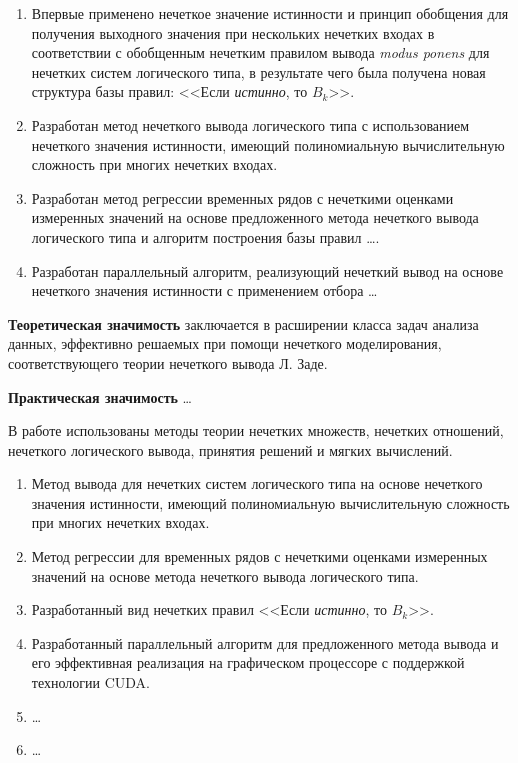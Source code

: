 {\novelty}
\begin{enumerate}[beginpenalty=10000] %
  \item Впервые применено нечеткое значение истинности и принцип обобщения для получения выходного значения при нескольких нечетких входах в соответствии с обобщенным нечетким правилом вывода \textit{modus ponens} для нечетких систем логического типа, в результате чего была получена новая структура базы правил: <<Если \textit{истинно}, то $B_k$>>.
  \item Разработан метод нечеткого вывода логического типа с использованием нечеткого значения истинности, имеющий полиномиальную вычислительную сложность при многих нечетких входах.
  \item Разработан метод регрессии временных рядов с нечеткими оценками измеренных значений на основе предложенного метода нечеткого вывода логического типа и алгоритм построения базы правил \dots.
  \item Разработан параллельный алгоритм, реализующий нечеткий вывод на основе нечеткого значения истинности с применением отбора \dots
\end{enumerate}

\textbf{Теоретическая значимость} заключается в расширении класса задач анализа данных, эффективно решаемых при помощи нечеткого моделирования, соответствующего теории нечеткого вывода Л. Заде.

\textbf{Практическая значимость} \ldots

{\methods} В работе использованы методы теории нечетких множеств, нечетких отношений, нечеткого логического вывода, принятия решений и мягких вычислений.

{}
\begin{enumerate}[beginpenalty=10000] %
  \item Метод вывода для нечетких систем логического типа на основе нечеткого значения истинности, имеющий полиномиальную вычислительную сложность при многих нечетких входах.
  \item Метод регрессии для временных рядов с нечеткими оценками измеренных значений на основе метода нечеткого вывода логического типа.
  \item Разработанный вид нечетких правил <<Если \textit{истинно}, то $B_k$>>.
  \item Разработанный параллельный алгоритм для предложенного метода вывода и его эффективная реализация на графическом процессоре с поддержкой технологии CUDA.
  \item \dots
  \item \dots
\end{enumerate}


